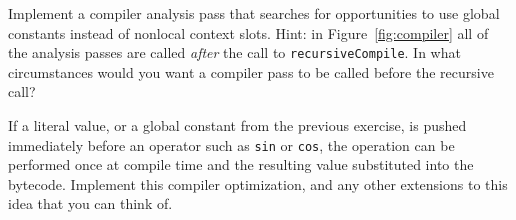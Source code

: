 Implement a compiler analysis pass that searches for opportunities
to use global constants instead of nonlocal context slots.
Hint: in Figure~\ref{fig:compiler} all of the analysis passes are called
\emph{after} the call to \verb!recursiveCompile!.
In what circumstances would you want a compiler pass to be called before
the recursive call?

\begin{samepage}
\ex
If a literal value, or a global constant from the previous exercise,
is pushed immediately before an operator such as \verb!sin! or \verb!cos!,
the operation can be performed once at compile time
and the resulting value substituted into the bytecode.
Implement this compiler optimization,
and any other extensions to this idea that you can think of.
\end{samepage}

